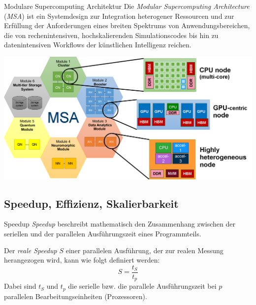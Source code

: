 \begin{jsc}{Modulare Supercomputing Architektur}
    Die \emph{Modular Supercomputing Architecture} (\emph{MSA}) ist ein Systemdesign zur Integration heterogener Ressourcen und zur Erfüllung der Anforderungen eines breiten Spektrums von Anwendungsbereichen, die von rechenintensiven, hochskalierenden Simulationscodes bis hin zu datenintensiven Workflows der künstlichen Intelligenz reichen.

    \vspace{1em}

    \centering
    \includegraphics[width=0.9\linewidth]{images/modular_supercomputing_architecture.png}
\end{jsc}

\subsection{Speedup, Effizienz, Skalierbarkeit}

\begin{defi}{Speedup}
    \emph{Speedup} beschreibt mathematisch den Zusammenhang zwischen der seriellen und der parallelen Ausführungszeit eines Programmteils.

    Der \emph{reale Speedup} $S$ einer parallelen Ausführung, der zur realen Messung herangezogen wird, kann wie folgt definiert werden:
    \[
        S = \frac{t_S}{t_p}
    \]
    Dabei sind $t_S$ und $t_p$ die serielle bzw. die parallele Ausführungszeit bei $p$ parallelen Bearbeitungseinheiten (Prozessoren).
\end{defi}

